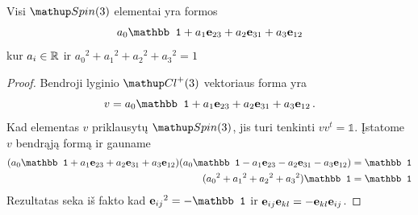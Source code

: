 \begin{proposition}
	\label{prop;spin_form}
	Visi $\spin$ elementai yra formos
	\begin{equation}
		a_0 \mathbb1 
		+ a_1 \vb e_{23}
		+ a_2 \vb e_{31}
		+ a_3 \vb e_{12}
	\end{equation}
	kur $a_i \in \mathbb{R}$ ir
	$
	{a_0}^2
	+{a_1}^2
	+{a_2}^2
	+{a_3}^2
	= 1
	$
\end{proposition}
\begin{proof}
	Bendroji lyginio $\Clp$ vektoriaus forma yra
	\begin{equation}
		v = 
		  a_0 \mathbb1 
		+ a_1 \vb e_{23}
		+ a_2 \vb e_{31}
		+ a_3 \vb e_{12}
		\,.
	\end{equation}
	Kad elementas $v$ priklausytų $\spin$, jis turi tenkinti
	$vv^t = \mathbb1$.
	Įstatome $v$ bendrąją formą ir gauname
	\begin{equation}
		\begin{aligned}
			(a_0 \mathbb1 
			+ a_1 \vb e_{23}
			+ a_2 \vb e_{31}
			+ a_3 \vb e_{12})
			(a_0 \mathbb1 
			- a_1 \vb e_{23}
			- a_2 \vb e_{31}
			- a_3 \vb e_{12})
			&= \mathbb1
			\\
			({a_0}^2
			+{a_1}^2
			+{a_2}^2
			+{a_3}^2)
			\mathbb1
			&= \mathbb1
		\end{aligned}
	\end{equation}
	Rezultatas seka iš fakto kad ${\vb e_{ij}}^2 = -\mathbb1$ 
	ir $\vb e_{ij} \vb e_{kl} = - \vb e_{kl} \vb e_{ij}$.
\end{proof}





